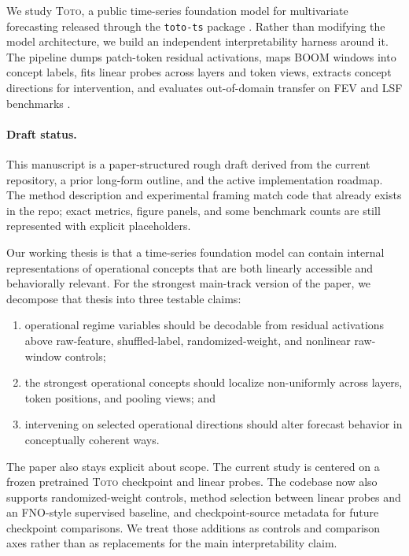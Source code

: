 \documentclass{article}
\newcommand{\model}{\textsc{Toto}}
\newcommand{\boom}{\textsc{BOOM}}
\newcommand{\fev}{\textsc{FEV}}
\newcommand{\lsf}{\textsc{LSF}}
\begin{document}
We study \model{}, a public time-series foundation model for multivariate forecasting released through the \texttt{toto-ts} package \citep{datadog2025toto}. Rather than modifying the model architecture, we build an independent interpretability harness around it. The pipeline dumps patch-token residual activations, maps \boom{} windows into concept labels, fits linear probes across layers and token views, extracts concept directions for intervention, and evaluates out-of-domain transfer on \fev{} and \lsf{} benchmarks \citep{datadog2025boom, shchur2025fev, thuml2024tslib}.

\paragraph{Draft status.}
This manuscript is a paper-structured rough draft derived from the current repository, a prior long-form outline, and the active implementation roadmap. The method description and experimental framing match code that already exists in the repo; exact metrics, figure panels, and some benchmark counts are still represented with explicit placeholders.

Our working thesis is that a time-series foundation model can contain internal representations of operational concepts that are both linearly accessible and behaviorally relevant. For the strongest main-track version of the paper, we decompose that thesis into three testable claims:
\begin{enumerate}[leftmargin=18pt]
\item operational regime variables should be decodable from residual activations above raw-feature, shuffled-label, randomized-weight, and nonlinear raw-window controls;
\item the strongest operational concepts should localize non-uniformly across layers, token positions, and pooling views; and
\item intervening on selected operational directions should alter forecast behavior in conceptually coherent ways.
\end{enumerate}

The paper also stays explicit about scope. The current study is centered on a frozen pretrained \model{} checkpoint and linear probes. The codebase now also supports randomized-weight controls, method selection between linear probes and an FNO-style supervised baseline, and checkpoint-source metadata for future checkpoint comparisons. We treat those additions as controls and comparison axes rather than as replacements for the main interpretability claim.
\end{document}
